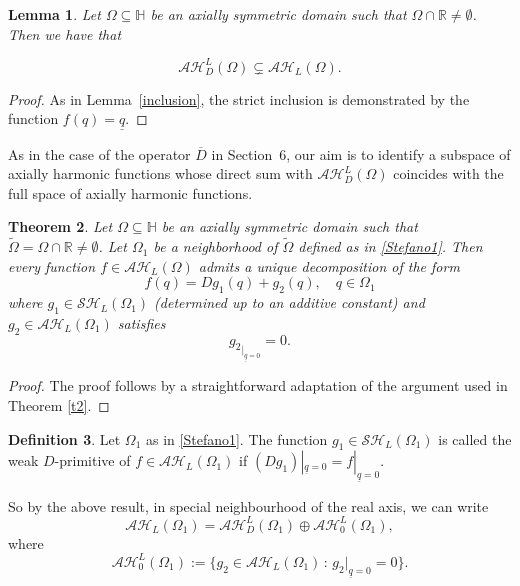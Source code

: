 \documentclass[reqno,11pt]{amsart}
\numberwithin{equation}{section}
\newcommand{\unq}{\underline{q}}
\newtheorem{theorem}{Theorem}[section]
\newtheorem{lemma}[theorem]{Lemma}
\theoremstyle{definition}
\newtheorem{definition}[theorem]{Definition}
\begin{document}
\begin{lemma}
	Let $\Omega\subseteq \mathbb H$ be an axially symmetric domain such that $\Omega\cap\mathbb R\neq\emptyset$. Then we have that

\begin{equation}
	\label{pinc}
	\mathcal{AH}^L_{D}(\Omega) \subsetneq \mathcal{AH}_L(\Omega).
\end{equation}	
\end{lemma}


\begin{proof}
As in Lemma~\ref{inclusion}, the strict inclusion is demonstrated by the function $f(q)=\underline{q}$.
\end{proof}

As in the case of the operator $\overline{D}$ in Section~6, our aim is to identify a subspace of axially harmonic functions whose direct sum with $\mathcal{AH}_D^L(\Omega)$ coincides with the full space of axially harmonic functions.



\begin{theorem}\label{t2_2}
	Let $\Omega\subseteq \mathbb H$ be an axially symmetric domain such that $\tilde\Omega=\Omega\cap\mathbb R\neq\emptyset$. Let $\Omega_1$ be a neighborhood of $\tilde \Omega$ defined as in \eqref{Stefano1}. Then every function $f\in\mathcal {AH}_L(\Omega)$ admits a unique decomposition of the form
\begin{equation}
\label{decoH}
f(q)=Dg_1(q)+g_2(q),\quad q\in\Omega_1
\end{equation}
	where $g_1\in\mathcal{SH}_L(\Omega_1)$ (determined up to an additive constant) and $g_2\in\mathcal{AH}_L(\Omega_1)$ satisfies
	$$ {g_2}_{|_{\unq=0}}=0 .$$
\end{theorem}

\begin{proof}
	The proof follows by a straightforward adaptation of the argument used in Theorem \ref{t2}.
\end{proof}


\begin{definition}
	\label{DDprimitive}
	Let $\Omega_1$ as in \eqref{Stefano1}. The function $g_1\in \mathcal{SH}_L(\Omega_1)$ is called the weak $D$-primitive of $f\in \mathcal{AH}_L(\Omega_1)$  if $( D{g_1})|_{\underline q=0}=f |_{\underline q=0}$.
\end{definition}


So by the above result, in special neighbourhood of the real axis, we can write
$$ \mathcal{AH}_L(\Omega_1)=\mathcal{AH}_D^L(\Omega_1)\oplus \mathcal {AH}_0^L(\Omega_1) ,$$
where
$$ \mathcal {AH}_0^L(\Omega_1):=\{g_2 \in  \mathcal{AH}_L(\Omega_1) \, : \, g_2 |_{\underline{q}=0}=0\}.$$
\end{document}
